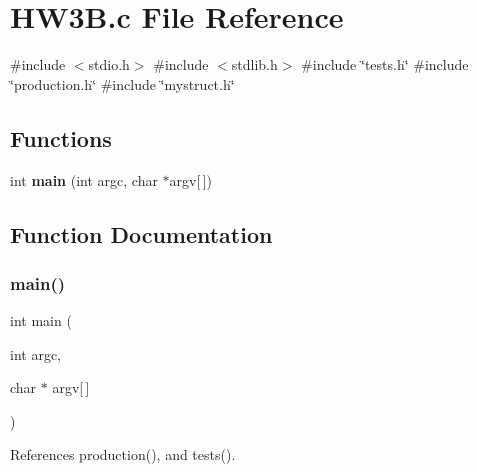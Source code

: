 \section{H\+W3\+B.\+c File Reference}
\label{HW3B_8c}
{\ttfamily \#include $<$stdio.\+h$>$}\newline
{\ttfamily \#include $<$stdlib.\+h$>$}\newline
{\ttfamily \#include \char`\"{}tests.\+h\char`\"{}}\newline
{\ttfamily \#include \char`\"{}production.\+h\char`\"{}}\newline
{\ttfamily \#include \char`\"{}mystruct.\+h\char`\"{}}\newline
\subsection*{Functions}
\begin{DoxyCompactItemize}
\item 
int \textbf{ main} (int argc, char $\ast$argv[$\,$])
\end{DoxyCompactItemize}


\subsection{Function Documentation}
\mbox{\label{HW3B_8c_a0ddf1224851353fc92bfbff6f499fa97}} 
\subsubsection{main()}
{\footnotesize\ttfamily int main (\begin{DoxyParamCaption}\item[{int}]{argc,  }\item[{char $\ast$}]{argv[$\,$] }\end{DoxyParamCaption})}



References production(), and tests().

